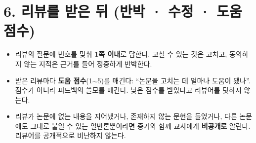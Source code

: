 \documentclass[11pt]{article}
\begin{document}
\section*{6. 리뷰를 받은 뒤 (반박 · 수정 · 도움 점수)}
\begin{itemize}
\item 리뷰의 질문에 번호를 맞춰 \textbf{1쪽 이내}로 답한다. 고칠 수 있는 것은 고치고, 동의하지 않는 지적은 근거를 들어 정중하게 반박한다.
\item 받은 리뷰마다 \textbf{도움 점수}(1$\sim$5)를 매긴다: ``논문을 고치는 데 얼마나 도움이 됐나''. 점수가 아니라 피드백의 쓸모를 매긴다. 낮은 점수를 받았다고 리뷰어를 탓하지 않는다.
\item 리뷰가 논문에 없는 내용을 지어냈거나, 존재하지 않는 문헌을 들었거나, 다른 논문에도 그대로 붙일 수 있는 일반론뿐이라면 증거와 함께 교사에게 \textbf{비공개로} 알린다. 리뷰어를 공개적으로 비난하지 않는다.
\end{itemize}

\vspace{6pt}
\end{document}
